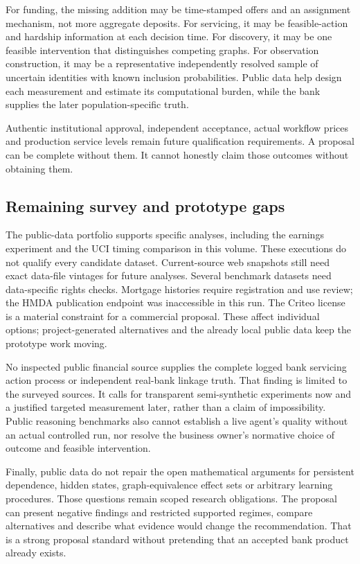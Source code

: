 For funding, the missing addition may be time-stamped offers and an
assignment mechanism, not more aggregate deposits. For servicing, it may
be feasible-action and hardship information at each decision time. For
discovery, it may be one feasible intervention that distinguishes
competing graphs. For observation construction, it may be a
representative independently resolved sample of uncertain identities
with known inclusion probabilities. Public data help design each
measurement and estimate its computational burden, while the bank
supplies the later population-specific truth.

Authentic institutional approval, independent acceptance, actual
workflow prices and production service levels remain future
qualification requirements. A proposal can be complete without them. It
cannot honestly claim those outcomes without obtaining them.

\hypertarget{remaining-survey-and-prototype-gaps}{%
\subsection{Remaining survey and prototype
gaps}\label{remaining-survey-and-prototype-gaps}}

The public-data portfolio supports specific analyses, including the
earnings experiment and the UCI timing comparison in this volume. These
executions do not qualify every candidate dataset. Current-source web
snapshots still need exact data-file vintages for future analyses.
Several benchmark datasets need data-specific rights checks. Mortgage
histories require registration and use review; the HMDA publication
endpoint was inaccessible in this run. The Criteo license is a material
constraint for a commercial proposal. These affect individual options;
project-generated alternatives and the already local public data keep
the prototype work moving.

No inspected public financial source supplies the complete logged bank
servicing action process or independent real-bank linkage truth. That
finding is limited to the surveyed sources. It calls for transparent
semi-synthetic experiments now and a justified targeted measurement
later, rather than a claim of impossibility. Public reasoning benchmarks
also cannot establish a live agent's quality without an actual
controlled run, nor resolve the business owner's normative choice of
outcome and feasible intervention.

Finally, public data do not repair the open mathematical arguments for
persistent dependence, hidden states, graph-equivalence effect sets or
arbitrary learning procedures. Those questions remain scoped research
obligations. The proposal can present negative findings and restricted
supported regimes, compare alternatives and describe what evidence would
change the recommendation. That is a strong proposal standard without
pretending that an accepted bank product already exists.
